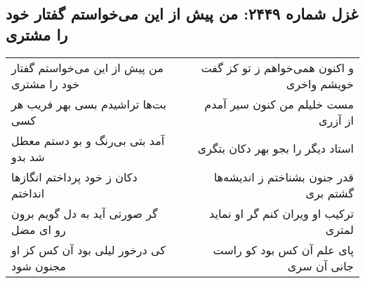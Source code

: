 \begin{center}
\section*{غزل شماره ۲۴۴۹: من پیش از این می‌خواستم گفتار خود را مشتری}
\label{sec:2449}
\begin{longtable}{l p{0.5cm} r}
من پیش از این می‌خواستم گفتار خود را مشتری
&&
و اکنون همی‌خواهم ز تو کز گفت خویشم واخری
\\
بت‌ها تراشیدم بسی بهر فریب هر کسی
&&
مست خلیلم من کنون سیر آمدم از آزری
\\
آمد بتی بی‌رنگ و بو دستم معطل شد بدو
&&
استاد دیگر را بجو بهر دکان بتگری
\\
دکان ز خود پرداختم انگازها انداختم
&&
قدر جنون بشناختم ز اندیشه‌ها گشتم بری
\\
گر صورتی آید به دل گویم برون رو ای مضل
&&
ترکیب او ویران کنم گر او نماید لمتری
\\
کی درخور لیلی بود آن کس کز او مجنون شود
&&
پای علم آن کس بود کو راست جانی آن سری
\\
\end{longtable}
\end{center}
